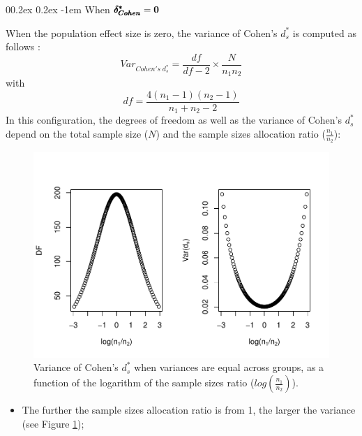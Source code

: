\documentclass[
  english,
  man,mask]{apa6}
\makeatletter
\providecommand{\tightlist}{%
  \setlength{\itemsep}{0pt}\setlength{\parskip}{0pt}}
\let\oldparagraph\paragraph
\renewcommand{\paragraph}[1]{\oldparagraph{#1}\mbox{}}
\renewcommand{\paragraph}{\@startsection{paragraph}{4}{\parindent}%
  {0\baselineskip \@plus 0.2ex \@minus 0.2ex}%
  {-1em}%
  {\normalfont\normalsize\bfseries\itshape\typesectitle}}
\makeatother
\begin{document}
\hypertarget{when-bf-pmbdelta_cohen0-1}{%
\paragraph{\texorpdfstring{When \(\bf \pmb{\delta^*_{Cohen}}=0\)}{When \textbackslash bf \textbackslash pmb\{\textbackslash delta\^{}*\_\{Cohen\}\}=0}}\label{when-bf-pmbdelta_cohen0-1}}

When the population effect size is zero, the variance of Cohen's \(d^*_s\) is computed as follows :
\[Var_{Cohen's \; d^*_s} = \frac{df}{df-2} \times \frac{N}{n_1n_2}\]
with \[df = \frac{4(n_1-1)(n_2-1)}{n_1+n_2-2}\]
In this configuration, the degrees of freedom as well as the variance of Cohen's \(d^*_s\) depend on the total sample size (\(N\)) and the sample sizes allocation ratio (\(\frac{n_1}{n_2}\)):

\begin{figure}
\centering
\includegraphics{Theoretical-Variance-of-all-estimators-as-a-function-of-population-parameters_files/figure-latex/varcohendprimeHomNratio2-1.pdf}
\caption{\label{fig:varcohendprimeHomNratio2}Variance of Cohen's \(d^*_s\) when variances are equal across groups, as a function of the logarithm of the sample sizes ratio (\(log\left(\frac{n_1}{n_2} \right)\)).}
\end{figure}

\begin{itemize}
\tightlist
\item
  The further the sample sizes allocation ratio is from 1, the larger the variance (see Figure \ref{fig:varcohendprimeHomNratio2});
\end{itemize}
\end{document}
